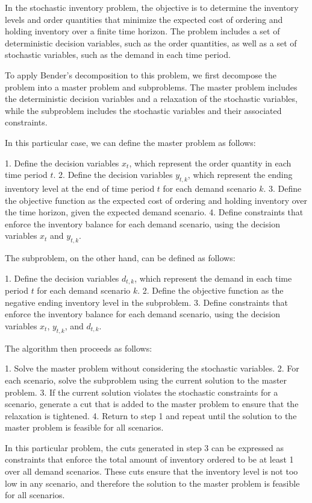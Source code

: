 In the stochastic inventory problem, the objective is to determine the inventory levels and order quantities that minimize the expected cost of ordering and holding inventory over a finite time horizon. The problem includes a set of deterministic decision variables, such as the order quantities, as well as a set of stochastic variables, such as the demand in each time period.

To apply Bender's decomposition to this problem, we first decompose the problem into a master problem and subproblems. The master problem includes the deterministic decision variables and a relaxation of the stochastic variables, while the subproblem includes the stochastic variables and their associated constraints.

In this particular case, we can define the master problem as follows:

1. Define the decision variables $x_t$, which represent the order quantity in each time period $t$.
2. Define the decision variables $y_{t,k}$, which represent the ending inventory level at the end of time period $t$ for each demand scenario $k$.
3. Define the objective function as the expected cost of ordering and holding inventory over the time horizon, given the expected demand scenario.
4. Define constraints that enforce the inventory balance for each demand scenario, using the decision variables $x_t$ and $y_{t,k}$.

The subproblem, on the other hand, can be defined as follows:

1. Define the decision variables $d_{t,k}$, which represent the demand in each time period $t$ for each demand scenario $k$.
2. Define the objective function as the negative ending inventory level in the subproblem.
3. Define constraints that enforce the inventory balance for each demand scenario, using the decision variables $x_t$, $y_{t,k}$, and $d_{t,k}$.

The algorithm then proceeds as follows:

1. Solve the master problem without considering the stochastic variables.
2. For each scenario, solve the subproblem using the current solution to the master problem.
3. If the current solution violates the stochastic constraints for a scenario, generate a cut that is added to the master problem to ensure that the relaxation is tightened.
4. Return to step 1 and repeat until the solution to the master problem is feasible for all scenarios.

In this particular problem, the cuts generated in step 3 can be expressed as constraints that enforce the total amount of inventory ordered to be at least 1 over all demand scenarios. These cuts ensure that the inventory level is not too low in any scenario, and therefore the solution to the master problem is feasible for all scenarios.

